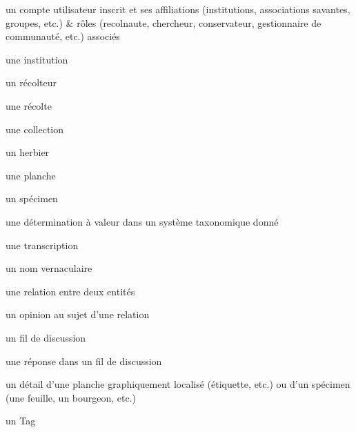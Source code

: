 \startchapter[title={Les types d'entités ReColNat(+)},reference=c:entites]

\startsection[title={Identification des entités d'intérêt}]

\startsubsection[title={Entités sociales}]

\startitemize
	\item un compte utilisateur inscrit et ses affiliations (institutions, associations savantes, groupes, etc.) & rôles (recolnaute, chercheur, conservateur, gestionnaire de communauté, etc.) associés
	\item une institution
\stopitemize

\startsubsection[title={Entités scientifiques},reference=c:entites:scientifiques]

\startitemize
	\item un récolteur
	\item une récolte
	\item une collection
	\item un herbier
	\item une planche
	\item un spécimen
	\item une détermination à valeur dans un système taxonomique donné
	\item une transcription
	\item un nom vernaculaire
\stopitemize

\startsubsection[title={Entités contributives}]

\startitemize
	\item une relation entre deux entités
	\item un opinion au sujet d'une relation
	\item un fil de discussion
	\item une réponse dans un fil de discussion
	\item un détail d'une planche graphiquement localisé (étiquette, etc.) ou d'un spécimen (une feuille, un bourgeon, etc.)
	\item un Tag
\stopitemize

